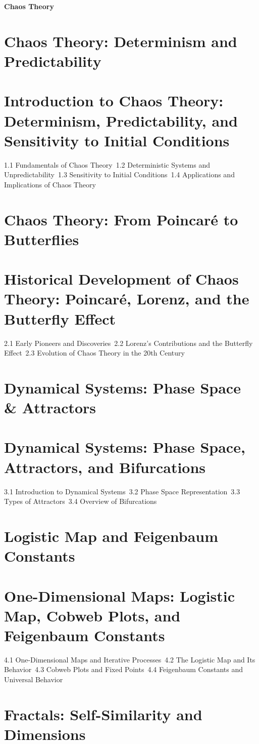 {\LARGE \bf{Chaos Theory}}
\section{Chaos Theory: Determinism and Predictability}
\section{Introduction to Chaos Theory: Determinism, Predictability, and Sensitivity to Initial Conditions}
1.1 Fundamentals of Chaos Theory\
1.2 Deterministic Systems and Unpredictability\
1.3 Sensitivity to Initial Conditions\
1.4 Applications and Implications of Chaos Theory\
\section{Chaos Theory: From Poincaré to Butterflies}
\section{Historical Development of Chaos Theory: Poincaré, Lorenz, and the Butterfly Effect}
2.1 Early Pioneers and Discoveries\
2.2 Lorenz's Contributions and the Butterfly Effect\
2.3 Evolution of Chaos Theory in the 20th Century\
\section{Dynamical Systems: Phase Space \& Attractors}
\section{Dynamical Systems: Phase Space, Attractors, and Bifurcations}
3.1 Introduction to Dynamical Systems\
3.2 Phase Space Representation\
3.3 Types of Attractors\
3.4 Overview of Bifurcations\
\section{Logistic Map and Feigenbaum Constants}
\section{One-Dimensional Maps: Logistic Map, Cobweb Plots, and Feigenbaum Constants}
4.1 One-Dimensional Maps and Iterative Processes\
4.2 The Logistic Map and Its Behavior\
4.3 Cobweb Plots and Fixed Points\
4.4 Feigenbaum Constants and Universal Behavior\
\section{Fractals: Self-Similarity and Dimensions}
